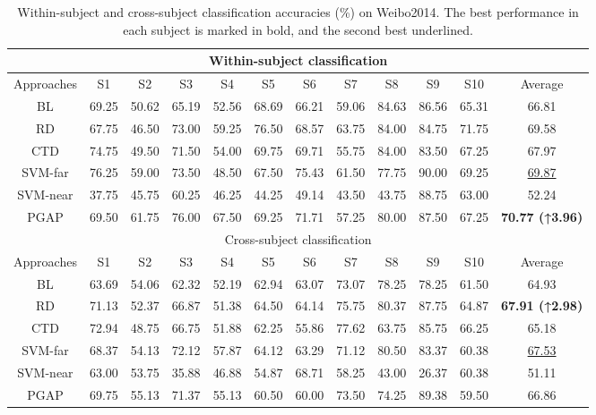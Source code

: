 \documentclass[journal,twocolumn]{IEEEtran}
\begin{document}
\begin{table}[htpb]
  \centering
  \caption{Within-subject and cross-subject classification accuracies (\%) on Weibo2014. The best performance in each subject is marked in bold, and the second best underlined.}
  \label{tab:weibo2014-result}
  \begin{tabular}{c|c|c|c|c|c|c|c|c|c|c|c}
  \toprule
  \multicolumn{12}{c}{Within-subject classification} \\
  \midrule
  Approaches & S1 & S2 & S3 & S4 & S5 & S6 & S7 & S8 & S9 & S10 & Average \\
  \midrule
  BL & 69.25 & 50.62 & 65.19 & 52.56 & 68.69 & 66.21 & 59.06 & 84.63 & 86.56 & 65.31 & 66.81 \\
  RD & 67.75 & 46.50 & 73.00 & 59.25 & 76.50 & 68.57 & 63.75 & 84.00 & 84.75 & 71.75 & 69.58 \\
  CTD & 74.75 & 49.50 & 71.50 & 54.00 & 69.75 & 69.71 & 55.75 & 84.00 & 83.50 & 67.25 & 67.97 \\
  SVM-far & 76.25 & 59.00 & 73.50 & 48.50 & 67.50 & 75.43 & 61.50 & 77.75 & 90.00 & 69.25 & \underline{69.87} \\
  SVM-near & 37.75 & 45.75 & 60.25 & 46.25 & 44.25 & 49.14 & 43.50 & 43.75 & 88.75 & 63.00 & 52.24 \\
  PGAP & 69.50 & 61.75 & 76.00 & 67.50 & 69.25 & 71.71 & 57.25 & 80.00 & 87.50 & 67.25 & \textbf{70.77 (↑3.96)} \\
  \midrule
  \multicolumn{12}{c}{Cross-subject classification} \\
  \midrule
  Approaches & S1 & S2 & S3 & S4 & S5 & S6 & S7 & S8 & S9 & S10 & Average \\
  \midrule
  BL & 63.69 & 54.06 & 62.32 & 52.19 & 62.94 & 63.07 & 73.07 & 78.25 & 78.25 & 61.50 & 64.93 \\
  RD & 71.13 & 52.37 & 66.87 & 51.38 & 64.50 & 64.14 & 75.75 & 80.37 & 87.75 & 64.87 & \textbf{67.91 (↑2.98)} \\
  CTD & 72.94 & 48.75 & 66.75 & 51.88 & 62.25 & 55.86 & 77.62 & 63.75 & 85.75 & 66.25 & 65.18 \\
  SVM-far & 68.37 & 54.13 & 72.12 & 57.87 & 64.12 & 63.29 & 71.12 & 80.50 & 83.37 & 60.38 & \underline{67.53} \\
  SVM-near & 63.00 & 53.75 & 35.88 & 46.88 & 54.87 & 68.71 & 58.25 & 43.00 & 26.37 & 60.38 & 51.11 \\
  PGAP & 69.75 & 55.13 & 71.37 & 55.13 & 60.50 & 60.00 & 73.50 & 74.25 & 89.38 & 59.50 & 66.86 \\
  \bottomrule
  \end{tabular}
\end{table}
  
\end{document}
